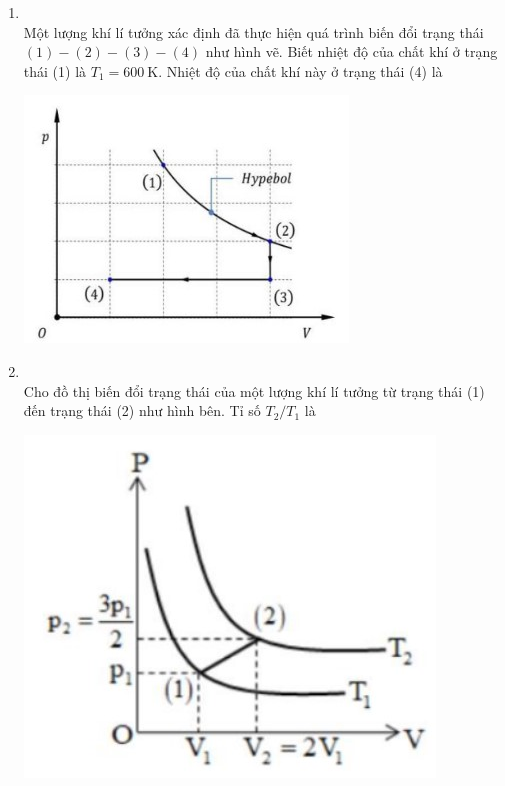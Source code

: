 \begin{enumerate}[label=\bfseries Câu \arabic*:, leftmargin=1.7cm]
\item {}\\
Một lượng khí lí tưởng xác định đã thực hiện quá trình biến đổi trạng thái $(1)-(2)-(3)-(4)$ như hình vẽ. Biết nhiệt độ của chất khí ở trạng thái (1) là $T_1=\SI{600}{\kelvin}$. Nhiệt độ của chất khí này ở trạng thái (4) là
\begin{center}
	\includegraphics[width=0.45\linewidth]{../figs/VN12-Y24-PH-SYL-014P-3}
\end{center}

\item {}\\
Cho đồ thị biến đổi trạng thái của một lượng khí lí tưởng từ trạng thái (1) đến trạng thái (2) như hình bên. Tỉ số $T_2/T_1$ là 
\begin{center}
	\includegraphics[width=0.45\linewidth]{../figs/VN12-Y24-PH-SYL-014P-2}
\end{center}


\end{enumerate}
